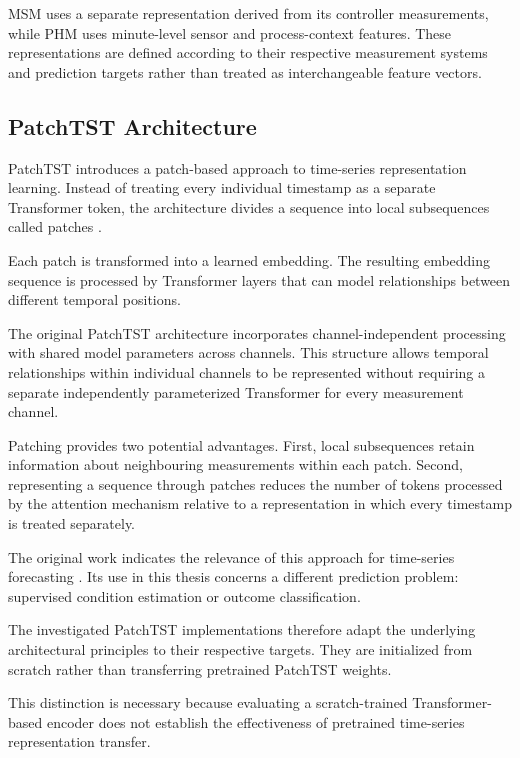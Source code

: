 MSM uses a separate representation derived from its controller measurements, while PHM uses minute-level sensor and process-context features. These representations are defined according to their respective measurement systems and prediction targets rather than treated as interchangeable feature vectors.

\subsection{PatchTST Architecture}

PatchTST introduces a patch-based approach to time-series representation learning. Instead of treating every individual timestamp as a separate Transformer token, the architecture divides a sequence into local subsequences called patches \parencite{Nie2023PatchTST}.

Each patch is transformed into a learned embedding. The resulting embedding sequence is processed by Transformer layers that can model relationships between different temporal positions.

The original PatchTST architecture incorporates channel-independent processing with shared model parameters across channels. This structure allows temporal relationships within individual channels to be represented without requiring a separate independently parameterized Transformer for every measurement channel.

Patching provides two potential advantages. First, local subsequences retain information about neighbouring measurements within each patch. Second, representing a sequence through patches reduces the number of tokens processed by the attention mechanism relative to a representation in which every timestamp is treated separately.

The original work indicates the relevance of this approach for time-series forecasting \parencite{Nie2023PatchTST}. Its use in this thesis concerns a different prediction problem: supervised condition estimation or outcome classification.

The investigated PatchTST implementations therefore adapt the underlying architectural principles to their respective targets. They are initialized from scratch rather than transferring pretrained PatchTST weights.

This distinction is necessary because evaluating a scratch-trained Transformer-based encoder does not establish the effectiveness of pretrained time-series representation transfer.

